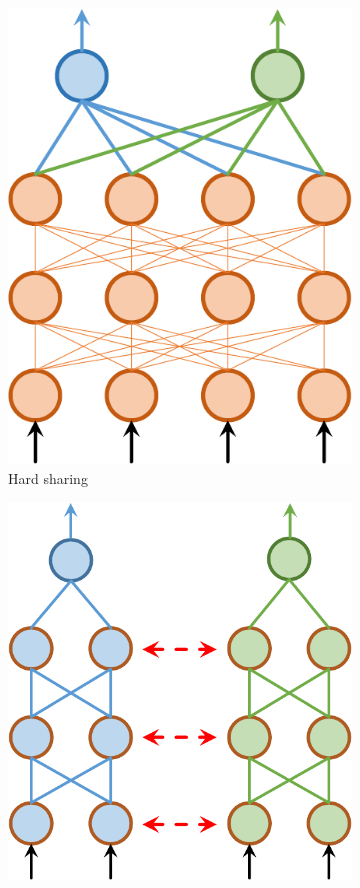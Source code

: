 \documentclass[letterpaper]{article} %
\begin{document}
\begin{figure}[htb]
\centering
\begin{subfigure}{0.45\linewidth}
\centering
\includegraphics[scale=.36]{3353_hard_sharing.pdf}
\caption{Hard sharing}
\label{sfig:hard-sharing}
\end{subfigure}\hfill
\begin{subfigure}{0.45\linewidth}
\centering
\includegraphics[scale=.36]{3353_soft_sharing.pdf}

\end{subfigure}
\end{figure}
\end{document}
